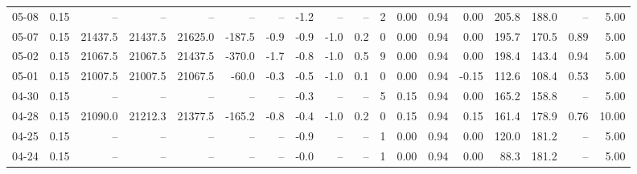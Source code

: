 \begin{threeparttable}
{\begin{tabular}{lrrrrrrrrrrrrrrrrr}
  05-08 &     0.15 &      -- &      -- &      -- &         -- &             -- &                      -1.2 &                       -- &                  -- &              2 &       0.00 &      0.94 &           0.00 &            205.8 &               188.0 &              -- &                   5.00 \\
  05-07 &     0.15 & 21437.5 & 21437.5 & 21625.0 &     -187.5 &           -0.9 &                      -0.9 &                     -1.0 &                 0.2 &              0 &       0.00 &      0.94 &           0.00 &            195.7 &               170.5 &            0.89 &                   5.00 \\
  05-02 &     0.15 & 21067.5 & 21067.5 & 21437.5 &     -370.0 &           -1.7 &                      -0.8 &                     -1.0 &                 0.5 &              9 &       0.00 &      0.94 &           0.00 &            198.4 &               143.4 &            0.94 &                   5.00 \\
  05-01 &     0.15 & 21007.5 & 21007.5 & 21067.5 &      -60.0 &           -0.3 &                      -0.5 &                     -1.0 &                 0.1 &              0 &       0.00 &      0.94 &          -0.15 &            112.6 &               108.4 &            0.53 &                   5.00 \\
  04-30 &     0.15 &      -- &      -- &      -- &         -- &             -- &                      -0.3 &                       -- &                  -- &              5 &       0.15 &      0.94 &           0.00 &            165.2 &               158.8 &              -- &                   5.00 \\
  04-28 &     0.15 & 21090.0 & 21212.3 & 21377.5 &     -165.2 &           -0.8 &                      -0.4 &                     -1.0 &                 0.2 &              0 &       0.15 &      0.94 &           0.15 &            161.4 &               178.9 &            0.76 &                  10.00 \\
  04-25 &     0.15 &      -- &      -- &      -- &         -- &             -- &                      -0.9 &                       -- &                  -- &              1 &       0.00 &      0.94 &           0.00 &            120.0 &               181.2 &              -- &                   5.00 \\
  04-24 &     0.15 &      -- &      -- &      -- &         -- &             -- &                      -0.0 &                       -- &                  -- &              1 &       0.00 &      0.94 &           0.00 &             88.3 &               181.2 &              -- &                   5.00 \\

\end{tabular}}
\end{threeparttable}
